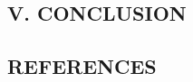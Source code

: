 \documentclass{article}
\begin{document}
\newpage
    \begin{minipage}{0.4\textwidth}
        \begin{center}
            \chapter{V. CONCLUSION}
        \end{center}
        \lipsum[2-4]
    \end{minipage}
    \hfill
    \begin{minipage}{0.4\textwidth}
        \begin{center}
            \chapter{REFERENCES}
        \end{center}
        \lipsum[2-4]
    \end{minipage}
\end{document}
